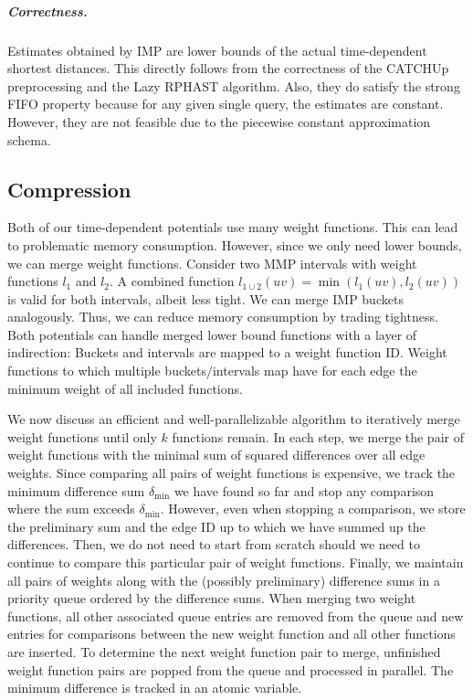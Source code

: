 \documentclass[a4paper,UKenglish,cleveref, autoref, thm-restate,anonymous]{lipics-v2021}
\begin{document}
\subparagraph{Correctness.}
Estimates obtained by IMP are lower bounds of the actual time-dependent shortest distances.
This directly follows from the correctness of the CATCHUp preprocessing and the Lazy RPHAST algorithm.
Also, they do satisfy the strong FIFO property because for any given single query, the estimates are constant.
However, they are not feasible due to the piecewise constant approximation schema.

\subsection{Compression}\label{sec:compression}

Both of our time-dependent potentials use many weight functions.
This can lead to problematic memory consumption.
However, since we only need lower bounds, we can merge weight functions.
Consider two MMP intervals with weight functions $l_1$ and $l_2$.
A combined function $l_{1 \cup 2}(uv) = \min(l_1(uv), l_2(uv))$ is valid for both intervals, albeit less tight.
We can merge IMP buckets analogously.
Thus, we can reduce memory consumption by trading tightness.
Both potentials can handle merged lower bound functions with a layer of indirection:
Buckets and intervals are mapped to a weight function ID.
Weight functions to which multiple buckets/intervals map have for each edge the minimum weight of all included functions.

We now discuss an efficient and well-parallelizable algorithm to iteratively merge weight functions until only $k$ functions remain.
In each step, we merge the pair of weight functions with the minimal sum of squared differences over all edge weights.
Since comparing all pairs of weight functions is expensive, we track the minimum difference sum $\delta_{\min}$ we have found so far and stop any comparison where the sum exceeds $\delta_{\min}$.
However, even when stopping a comparison, we store the preliminary sum and the edge ID up to which we have summed up the differences.
Then, we do not need to start from scratch should we need to continue to compare this particular pair of weight functions.
Finally, we maintain all pairs of weights along with the (possibly preliminary) difference sums in a priority queue ordered by the difference sums.
When merging two weight functions, all other associated queue entries are removed from the queue and new entries for comparisons between the new weight function and all other functions are inserted.
To determine the next weight function pair to merge, unfinished weight function pairs are popped from the queue and processed in parallel.
The minimum difference is tracked in an atomic variable.
\end{document}
